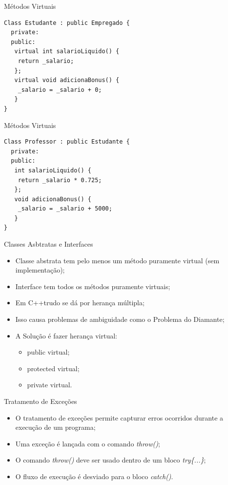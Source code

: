 \documentclass[12pt,table,xcolor={dvipsnames}]{beamer}
\begin{document}
\begin{frame}[fragile]{Métodos Virtuais}
\begin{lstlisting}
Class Estudante : public Empregado {
  private:
  public:
   virtual int salarioLiquido() {
    return _salario;
   };
   virtual void adicionaBonus() {
    _salario = _salario + 0;
   }
}
\end{lstlisting}
\end{frame}

\begin{frame}[fragile]{Métodos Virtuais}
\begin{lstlisting}
Class Professor : public Estudante {
  private:
  public:
   int salarioLiquido() {
    return _salario * 0.725;
   };
   void adicionaBonus() {
    _salario = _salario + 5000;
   }
}
\end{lstlisting}
\end{frame}

\begin{frame}{Classes Asbtratas e Interfaces}
\begin{itemize}
\item Classe abstrata tem pelo menos um método puramente virtual (sem implementação);
\item Interface tem todos os métodos puramente virtuais;
\item Em C++trudo se dá por herança múltipla;
\item Isso causa problemas de ambiguidade como o Problema do Diamante;
\item A Solução é fazer herança virtual:
\begin{itemize}
\item public virtual;
\item protected virtual;
\item private virtual.
\end{itemize}
\end{itemize}
\end{frame}

\begin{frame}{Tratamento de Exceções}
\begin{itemize}
\item O tratamento de exceções permite capturar erros ocorridos durante a execução de um programa;
\item Uma exceção é lançada com o comando \textit{throw()};
\item O comando \textit{throw()} deve ser usado dentro de um bloco \textit{try\{...\}};
\item O fluxo de execução é desviado para o bloco \textit{catch()}.
\end{itemize}
\end{frame}
\end{document}
